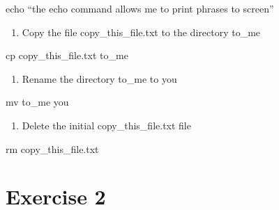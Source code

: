 \documentclass[
  letterpaper,
  DIV=11,
  numbers=noendperiod]{scrreprt}
\newenvironment{Shaded}{\begin{snugshade}}{\end{snugshade}}
\newcommand{\BuiltInTok}[1]{\textcolor[rgb]{0.00,0.23,0.31}{#1}}
\newcommand{\FunctionTok}[1]{\textcolor[rgb]{0.28,0.35,0.67}{#1}}
\newcommand{\NormalTok}[1]{\textcolor[rgb]{0.00,0.23,0.31}{#1}}
\providecommand{\tightlist}{%
  \setlength{\itemsep}{0pt}\setlength{\parskip}{0pt}}\usepackage{longtable,booktabs,array}
\begin{document}
\begin{Shaded}
\begin{Highlighting}[]
\BuiltInTok{echo}\NormalTok{ “the echo command allows me to print phrases to screen”}
\end{Highlighting}
\end{Shaded}

\begin{enumerate}
\def\labelenumi{\alph{enumi}.}
\setcounter{enumi}{2}
\tightlist
\item
  Copy the file copy\_this\_file.txt to the directory to\_me
\end{enumerate}

\begin{Shaded}
\begin{Highlighting}[]
\FunctionTok{cp}\NormalTok{ copy\_this\_file.txt to\_me}
\end{Highlighting}
\end{Shaded}

\begin{enumerate}
\def\labelenumi{\alph{enumi}.}
\setcounter{enumi}{3}
\tightlist
\item
  Rename the directory to\_me to you
\end{enumerate}

\begin{Shaded}
\begin{Highlighting}[]
\FunctionTok{mv}\NormalTok{ to\_me you}
\end{Highlighting}
\end{Shaded}

\begin{enumerate}
\def\labelenumi{\alph{enumi}.}
\setcounter{enumi}{5}
\tightlist
\item
  Delete the initial copy\_this\_file.txt file
\end{enumerate}

\begin{Shaded}
\begin{Highlighting}[]
\FunctionTok{rm}\NormalTok{ copy\_this\_file.txt}
\end{Highlighting}
\end{Shaded}

\hypertarget{exercise2_answers}{%
\chapter*{Exercise 2}\label{exercise2_answers}}

\end{document}
